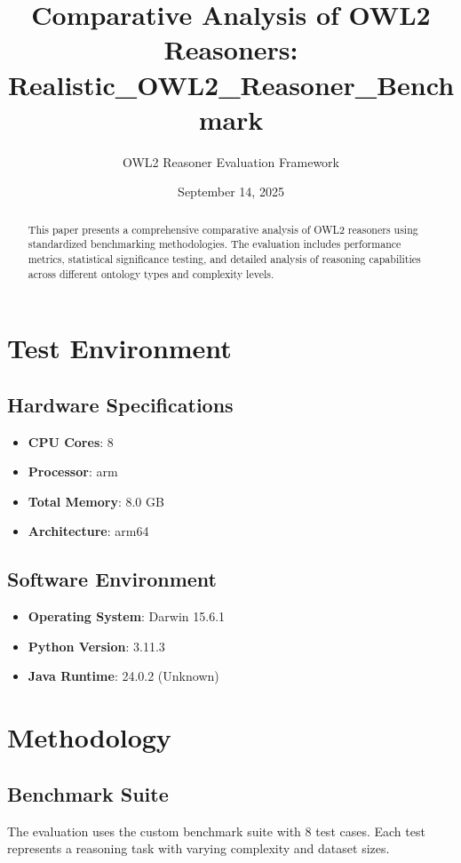 \documentclass[11pt,a4paper]{{article}}
\title{{Comparative Analysis of OWL2 Reasoners: Realistic_OWL2_Reasoner_Benchmark}}
\author{{OWL2 Reasoner Evaluation Framework}}
\date{{September 14, 2025}}
\begin{document}
\maketitle

\begin{abstract}
This paper presents a comprehensive comparative analysis of OWL2 reasoners using standardized benchmarking methodologies. The evaluation includes performance metrics, statistical significance testing, and detailed analysis of reasoning capabilities across different ontology types and complexity levels.
\end{abstract}

\tableofcontents

\newpage

\section{Test Environment}

\subsection{Hardware Specifications}
\begin{itemize}
    \item \textbf{CPU Cores}: 8
    \item \textbf{Processor}: arm
    \item \textbf{Total Memory}: 8.0 GB
    \item \textbf{Architecture}: arm64
\end{itemize}

\subsection{Software Environment}
\begin{itemize}
    \item \textbf{Operating System}: Darwin 15.6.1
    \item \textbf{Python Version}: 3.11.3
    \item \textbf{Java Runtime}: 24.0.2 (Unknown)
\end{itemize}


\section{Methodology}

\subsection{Benchmark Suite}
The evaluation uses the custom benchmark suite with 8 test cases. Each test represents a reasoning task with varying complexity and dataset sizes.
\end{document}
